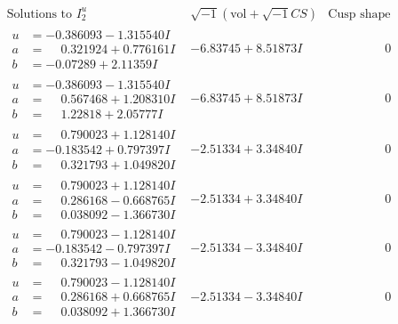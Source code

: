 \documentclass[1p]{elsarticle_modified}
\theoremstyle{definition}
\newcommand{\I}{\sqrt{-1}}
\begin{document}
$$\begin{array}{c|c|c}
 \end{array}$$\newpage$$\begin{array}{c|c|c}  
\text{Solutions to }I^u_{2}& \I (\text{vol} + \sqrt{-1}CS) & \text{Cusp shape}\\
 \hline 
\begin{aligned}
u &= -0.386093 - 1.315540 I \\
a &= \phantom{-}0.321924 + 0.776161 I \\
b &= -0.07289 + 2.11359 I\end{aligned}
 & -6.83745 + 8.51873 I & \phantom{-0.000000 } 0 \\ \hline\begin{aligned}
u &= -0.386093 - 1.315540 I \\
a &= \phantom{-}0.567468 + 1.208310 I \\
b &= \phantom{-}1.22818 + 2.05777 I\end{aligned}
 & -6.83745 + 8.51873 I & \phantom{-0.000000 } 0 \\ \hline\begin{aligned}
u &= \phantom{-}0.790023 + 1.128140 I \\
a &= -0.183542 + 0.797397 I \\
b &= \phantom{-}0.321793 + 1.049820 I\end{aligned}
 & -2.51334 + 3.34840 I & \phantom{-0.000000 } 0 \\ \hline\begin{aligned}
u &= \phantom{-}0.790023 + 1.128140 I \\
a &= \phantom{-}0.286168 - 0.668765 I \\
b &= \phantom{-}0.038092 - 1.366730 I\end{aligned}
 & -2.51334 + 3.34840 I & \phantom{-0.000000 } 0 \\ \hline\begin{aligned}
u &= \phantom{-}0.790023 - 1.128140 I \\
a &= -0.183542 - 0.797397 I \\
b &= \phantom{-}0.321793 - 1.049820 I\end{aligned}
 & -2.51334 - 3.34840 I & \phantom{-0.000000 } 0 \\ \hline\begin{aligned}
u &= \phantom{-}0.790023 - 1.128140 I \\
a &= \phantom{-}0.286168 + 0.668765 I \\
b &= \phantom{-}0.038092 + 1.366730 I\end{aligned}
 & -2.51334 - 3.34840 I & \phantom{-0.000000 } 0 \\ \hline\begin{aligned}

\end{aligned}
\end{array}$$
\end{document}
